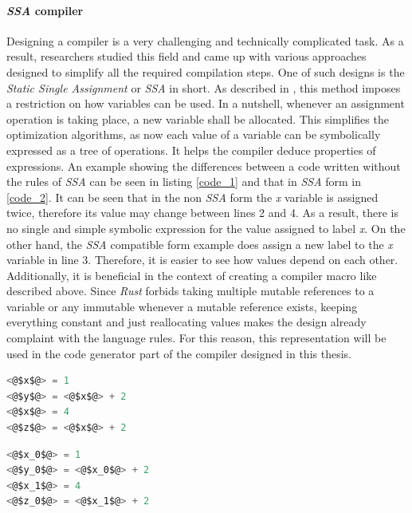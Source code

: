 \paragraph{\textit{SSA} compiler} \label{ssadec}
Designing a compiler is a very challenging and technically complicated task. As a result, researchers studied this field and came up with various approaches designed to simplify all the required compilation steps. One of such designs is the \textit{Static Single Assignment} or \textit{SSA} in short. As described in \cite{ssabook}, this method imposes a restriction on how variables can be used. In a nutshell, whenever an assignment operation is taking place, a new variable shall be allocated. This simplifies the optimization algorithms, as now each value of a variable can be symbolically expressed as a tree of operations. It helps the compiler deduce properties of expressions. An example showing the differences between a code written without the rules of \textit{SSA} can be seen in listing \ref{code_1} and that in \textit{SSA} form in \ref{code_2}. It can be seen that in the non \textit{SSA} form the \textit{x} variable is assigned twice, therefore its value may change between lines 2 and 4. As a result, there is no single and simple symbolic expression for the value assigned to label \textit{x}. On the other hand, the \textit{SSA} compatible form example does assign a new label to the \textit{x} variable in line 3. Therefore, it is easier to see how values depend on each other. Additionally, it is beneficial in the context of creating a compiler macro like described above. Since \textit{Rust} forbids taking multiple mutable references to a variable or any immutable whenever a mutable reference exists, keeping everything constant and just reallocating values makes the design already complaint with the language rules. For this reason, this representation will be used in the code generator part of the compiler designed in this thesis.

\begin{minipage}{.4\textwidth}
    \begin{lstlisting}[language=C,caption={Code example containing assigments.},captionpos=b,label={code_1}]
<@$x$@> = 1
<@$y$@> = <@$x$@> + 2
<@$x$@> = 4
<@$z$@> = <@$x$@> + 2
    \end{lstlisting}
\end{minipage}
\hfill\vline\hfill
\begin{minipage}{.4\textwidth}
    \begin{lstlisting}[language=C,caption={Code example in SSO notation.},captionpos=b,label={code_2}]
<@$x_0$@> = 1
<@$y_0$@> = <@$x_0$@> + 2
<@$x_1$@> = 4
<@$z_0$@> = <@$x_1$@> + 2
    \end{lstlisting}    
\end{minipage}
